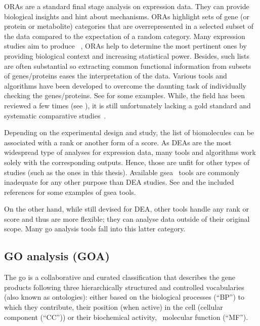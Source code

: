 \Glspl{ORA} are a standard final stage analysis on expression data.
They can provide biological insights and hint about mechanisms.
\Glspl{ORA} highlight sets of gene (or protein or metabolite) categories
that are overrepresented in a selected subset of the data
compared to the expectation of a random category.
Many expression studies aim to produce ~,
\glspl{ORA} help to determine the most pertinent ones
by providing biological context and increasing statistical power.
Besides, such lists are often substantial
so extracting common functional information from subsets of genes/proteins eases
the interpretation of the data.
Various tools and algorithms have been developed
to overcome the daunting task of individually checking the genes/proteins.
See \citet{Shi_Jing2015-yh} for some examples.
While, the field has been reviewed a few times
(see \citet{Khatri2005-su,Huang2009-zk,Khatri2012-ki}),
it is still unfortunately lacking a gold standard
and systematic comparative studies~.\mybr\

Depending on the experimental design and study,
the list of biomolecules can be associated with a rank or another form of a score.
As \glspl{DEA} are the most widespread type of analyses for expression data,
many tools and algorithms work solely with the corresponding outputs.
Hence, those are unfit for other types of studies
(such as the ones in this thesis).
Available \gls{gsea}~ tools are commonly inadequate
for any other purpose than \gls{DEA} studies.
See \citet{Tamayo2012-qw,Irizarry2009-sc}
and the included references for some examples of \gls{gsea} tools.\mybr\

On the other hand, while still devised for \gls{DEA},
other tools handle any rank or score and thus are more flexible;
they can analyse data outside of their original scope.
Many \gls{go} analysis tools fall into this latter category.\mybr\

\subsection{GO analysis (GOA)}\label{sec:goaGeneralities}
The \gls{go} is a collaborative and curated classification
that describes the gene products
following three hierarchically structured and controlled vocabularies
(also known as ontologies):
either based on the biological processes (\enquote{BP}) to which they contribute,
their position (when active) in the cell (cellular component (\enquote{CC})) or
their biochemical activity, \ie\ molecular function (\enquote{MF}).~\mybr\

